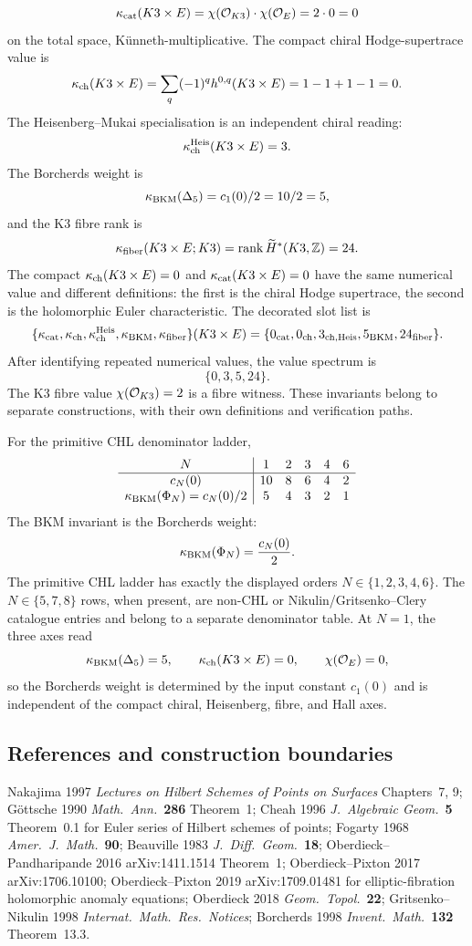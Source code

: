 \[
  \kappa_{\mathrm{cat}}(K3\times E)
  =
  \chi(\mathcal O_{K3})\cdot\chi(\mathcal O_{E})
  =
  2\cdot 0
  =
  0
\]
on the total space, Künneth-multiplicative.  The compact chiral
Hodge-supertrace value is
\[
  \kappa_{\mathrm{ch}}(K3\times E)
  =
  \sum_q(-1)^q h^{0,q}(K3\times E)
  =
  1-1+1-1
  =
  0.
\]
The Heisenberg--Mukai specialisation is an independent chiral reading:
\[
  \kappa_{\mathrm{ch}}^{\mathrm{Heis}}(K3\times E)=3.
\]
The Borcherds weight is
\[
  \kappa_{\mathrm{BKM}}(\Delta_5)=c_{1}(0)/2=10/2=5,
\]
and the K3 fibre rank is
\[
  \kappa_{\mathrm{fiber}}(K3\times E;K3)
  =
  \operatorname{rank}\widetilde H^{*}(K3,\mathbb Z)
  =
  24.
\]
The compact \(\kappa_{\mathrm{ch}}(K3\times E)=0\) and \(\kappa_{\mathrm{cat}}(K3\times E)=0\)
have the same numerical value and different definitions: the first is
the chiral Hodge supertrace, the second is the holomorphic Euler
characteristic.  The decorated slot list is
\[
  \{\kappa_{\mathrm{cat}},\kappa_{\mathrm{ch}},\kappa_{\mathrm{ch}}^{\mathrm{Heis}},\kappa_{\mathrm{BKM}},\kappa_{\mathrm{fiber}}\}(K3\times E)
  =
  \{0_{\mathrm{cat}},0_{\mathrm{ch}},3_{\mathrm{ch},\mathrm{Heis}},5_{\mathrm{BKM}},24_{\mathrm{fiber}}\}.
\]
After identifying repeated numerical values, the value spectrum is
\[
  \{0,3,5,24\}.
\]
The K3 fibre value \(\chi(\mathcal O_{K3})=2\) is a fibre witness. These
invariants belong to separate constructions, with their own definitions
and verification paths.

For the primitive CHL denominator ladder,
\[
\begin{array}{c|ccccc}
N & 1 & 2 & 3 & 4 & 6 \\ \hline
c_N(0) & 10 & 8 & 6 & 4 & 2 \\
\kappa_{\mathrm{BKM}}(\Phi_N)=c_N(0)/2 & 5 & 4 & 3 & 2 & 1
\end{array}
\]
The BKM invariant is the Borcherds weight:
\[
  \kappa_{\mathrm{BKM}}(\Phi_N)=\frac{c_N(0)}{2}.
\]
The primitive CHL ladder has exactly the displayed orders
\(N\in\{1,2,3,4,6\}\).  The \(N\in\{5,7,8\}\) rows, when present, are
non-CHL or Nikulin/Gritsenko--Clery catalogue entries and belong to a
separate denominator table.
At \(N=1\), the three axes read
\[
  \kappa_{\mathrm{BKM}}(\Delta_5)=5,\qquad
  \kappa_{\mathrm{ch}}(K3\times E)=0,\qquad
  \chi(\mathcal O_E)=0,
\]
so the Borcherds weight is determined by the input constant \(c_1(0)\)
and is independent of the compact chiral, Heisenberg, fibre, and Hall
axes.

\subsection*{References and construction boundaries}

Nakajima 1997 \emph{Lectures on Hilbert Schemes of Points on Surfaces}
Chapters~7, 9; Göttsche 1990 \emph{Math.\ Ann.}~\textbf{286} Theorem~1;
Cheah 1996 \emph{J.\ Algebraic Geom.}~\textbf{5} Theorem~0.1 for Euler
series of Hilbert schemes of points; Fogarty 1968
\emph{Amer.\ J.\ Math.}~\textbf{90};
Beauville 1983 \emph{J.\ Diff.\ Geom.}~\textbf{18};
Oberdieck--Pandharipande 2016 arXiv:1411.1514 Theorem~1;
Oberdieck--Pixton 2017 arXiv:1706.10100; Oberdieck--Pixton 2019
arXiv:1709.01481 for elliptic-fibration holomorphic anomaly equations;
Oberdieck 2018
\emph{Geom.\ Topol.}~\textbf{22}; Gritsenko--Nikulin 1998
\emph{Internat.\ Math.\ Res.\ Notices}; Borcherds 1998
\emph{Invent.\ Math.}~\textbf{132} Theorem~13.3.

